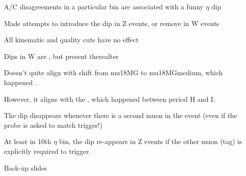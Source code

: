  {
 \iteb
 \item A/C disagreements in a particular bin are associated with a funny $\eta$ dip
 \item Made attempts to introduce the dip in Z events, or remove in W events
 \iteb
 \item All kinematic and quality cuts have no effect
 \item Dips in W are , but present thereafter
 \iteb
 \item Doesn't quite align with shift from mu18MG to mu18MGmedium, which happened .
 \item However, it aligns with the , which happened between period H and I.
 \itee
 \item The dip disappears whenever there is a second muon in the event (even if the probe is asked to match trigger!)
 \iteb
 \item At least in 10th $\eta$ bin, the dip re-appears in Z events if the other muon (tag) is explicitly required to  trigger.
 \itee
 \itee
 \itee
}


\appendix
{}
\setcounter{finalframe}{\value{framenumber}}

\slide{}
{

\centering
\Huge Back-up slides
}
